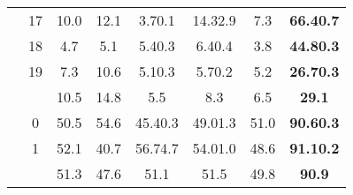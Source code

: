 \documentclass{article}
\begin{document}
\begin{table}[ht!]
\begin{tabular}{c c c c c c c c}
 & 17 & 10.0 & 12.1 & 3.70.1 & 14.32.9 & 7.3 & \textbf{66.40.7}\\
 & 18 & 4.7 & 5.1 & 5.40.3 & 6.40.4 & 3.8 & \textbf{44.80.3}\\
 & 19 & 7.3 & 10.6 & 5.10.3 & 5.70.2 & 5.2 & \textbf{26.70.3}\\
&   & 10.5 & 14.8 & 5.5 & 8.3 & 6.5 & \textbf{29.1}\\
\midrule
{} & 0 & 50.5 & 54.6 & 45.40.3 & 49.01.3 & 51.0 & \textbf{90.60.3}\\
 & 1 & 52.1 & 40.7 & 56.74.7 & 54.01.0 & 48.6 & \textbf{91.10.2}\\
&   & 51.3 & 47.6 & 51.1 & 51.5 & 49.8 & \textbf{90.9}\\

\bottomrule[1.5pt]
\end{tabular}
\end{table}
\end{document}

